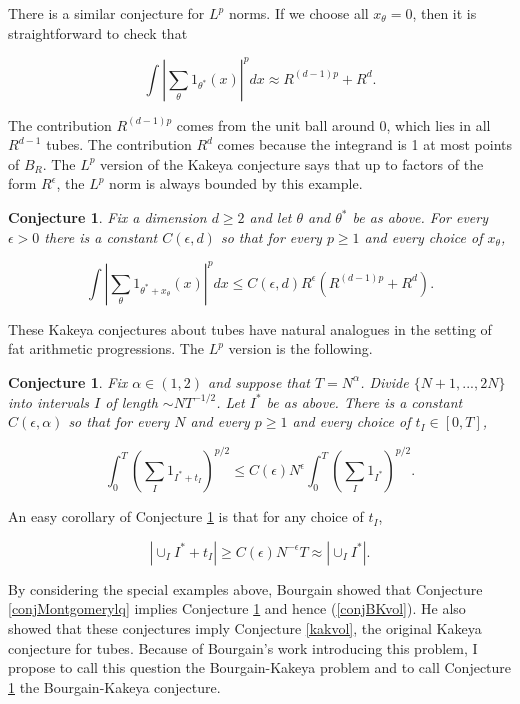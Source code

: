 \documentclass{amsart}
\newtheorem{conj}[prop]{Conjecture}
\newcommand{\eps}{\epsilon}
\begin{document}
There is a similar conjecture for $L^p$ norms.   If we choose all $x_\theta = 0$,  then it is straightforward to check that

$$ \int \left| \sum_\theta 1_{\theta^*} (x) \right|^p dx \approx R^{(d-1)p} + R^d. $$

\noindent The contribution $R^{(d-1)p}$ comes from the unit ball around 0,  which lies in all $R^{d-1}$ tubes.   The contribution $R^d$ comes because the integrand is 1 at most points of $B_R$.   The $L^p$ version of the Kakeya conjecture says that up to factors of the form $R^\epsilon$, the $L^p$ norm is always bounded by this example.   

\begin{conj} \label{kaklp} Fix a dimension $d \ge 2$ and let $\theta$ and $\theta^*$ be as above.   For every $\epsilon > 0$ there is a constant $C(\epsilon, d)$ so that for every $p \ge 1$ and every choice of $x_\theta$, 

$$ \int \left| \sum_\theta 1_{\theta^* + x_\theta} (x) \right|^p dx \le C(\epsilon, d) R^\epsilon \left( R^{(d-1)p} + R^d \right). $$

\end{conj}

These Kakeya conjectures about tubes have natural analogues in the setting of fat arithmetic progressions.   The $L^p$ version is the following.

\begin{conj} \label{bourkaklp} Fix $\alpha \in (1,2)$ and suppose that $T = N^\alpha$.    Divide $\{N+1, ..., 2N\}$ into intervals $I$ of length $\sim N T^{-1/2}$.   Let $I^*$ be as above.   There is a constant $C(\epsilon, \alpha)$ so that for every $N$ and every $p \ge 1$ and every choice of $t_I \in [0,T]$,  

\begin{equation} \label{conjBK}
 \int_0^T \left( \sum_I  1_{I^* + t_I} \right)^{p/2} \le C(\epsilon) N^\epsilon  \int_0^T \left( \sum_I  1_{I^*} \right)^{p/2}. 
\end{equation}

\end{conj}

An easy corollary of Conjecture \ref{bourkaklp} is that for any choice of $t_I$,

\begin{equation} \label{conjBKvol}  | \cup_I I^* + t_I | \ge C(\eps) N^{-\epsilon} T \approx | \cup_I I^*|. 
\end{equation}

By considering the special examples above,  Bourgain showed that Conjecture \ref{conjMontgomerylq} implies Conjecture \ref{bourkaklp} and hence
(\ref{conjBKvol}).   He also showed that these conjectures imply Conjecture \ref{kakvol},  the original Kakeya conjecture for tubes.  Because of Bourgain's work introducing this problem,  I propose to call this question the Bourgain-Kakeya problem and to call Conjecture \ref{bourkaklp} the Bourgain-Kakeya conjecture.  
\end{document}
